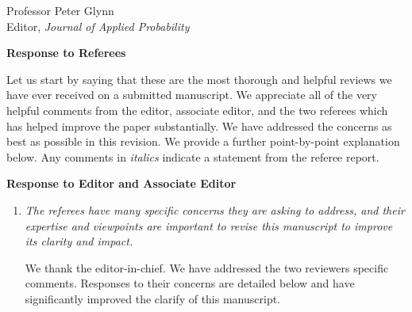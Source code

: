 \documentclass[11pt]{letter} %
\begin{document}

\begin{letter}{Professor
	Peter Glynn\\
	Editor, {\em Journal of Applied Probability}}



\signature{Walter Dempsey\\
University of Michigan\\
Department of Biostatistics\\
1415 Washington Heights\\
Ann Arbor, MI 48103} %


\vspace{5mm}

\newpage

{\bf Response to Referees}

Let us start by saying that these are the most thorough and helpful reviews we have ever received on a submitted manuscript.  We appreciate all of the very helpful comments from the editor, associate editor, and the two referees which has helped improve the paper substantially. We have addressed the concerns as best as possible in this revision. We provide a further point-by-point explanation below. Any comments in {\it italics} indicate a statement from the referee report.

{\bf Response to Editor and Associate Editor}
\begin{enumerate}
\item {\it The referees have many specific concerns they are asking to address, and their expertise and viewpoints are important to revise this manuscript to improve its clarity and impact.}

\vspace{5mm}
We thank the editor-in-chief.  We have addressed the two reviewers specific comments.  Responses to their concerns are detailed below and have significantly improved the clarify of this manuscript.
\vspace{5mm}


\end{enumerate}
\end{letter}
\end{document}
